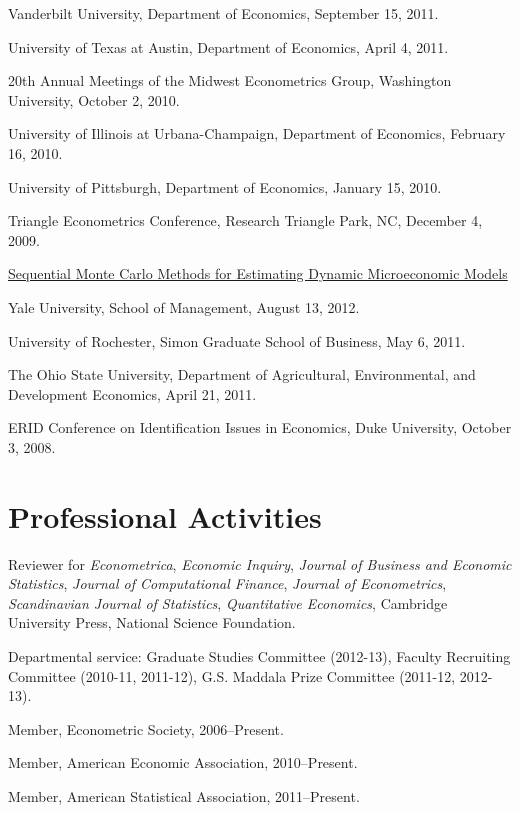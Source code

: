\documentclass[10pt,letterpaper]{article}
\renewenvironment{itemize}{
  \begin{list}{}{
    \setlength{\leftmargin}{1.5em}
    \setlength{\itemsep}{0.25em}
    \setlength{\parskip}{0pt}
    \setlength{\parsep}{0.25em}
  }
}{
  \end{list}
}
\begin{document}
\begin{itemize}
  \begin{itemize}
  \item Vanderbilt University, Department of Economics,
    September 15, 2011.
  \item University of Texas at Austin, Department of Economics,
    April 4, 2011.
  \item 20th Annual Meetings of the Midwest Econometrics Group,
    Washington University,
    October 2, 2010.
  \item University of Illinois at Urbana-Champaign, Department of Economics,
    February 16, 2010.
  \item University of Pittsburgh, Department of Economics,
    January 15, 2010.
  \item Triangle Econometrics Conference,
    Research Triangle Park, NC,
    December 4, 2009.
  \end{itemize}

\item \href{http://jblevins.org/research/smcdmm}{Sequential Monte Carlo Methods for Estimating Dynamic Microeconomic Models}

  \begin{itemize}
  \item Yale University, School of Management,
    August 13, 2012.
  \item University of Rochester, Simon Graduate School of Business,
    May 6, 2011.
  \item The Ohio State University,
    Department of Agricultural, Environmental, and Development Economics,
    April 21, 2011.
  \item ERID Conference on Identification Issues in Economics,
    Duke University, October 3, 2008.
  \end{itemize}

\end{itemize}

\section*{Professional Activities}

\begin{itemize}
\item Reviewer for
  \textit{Econometrica}, %
  \textit{Economic Inquiry}, %
  \textit{Journal of Business and Economic Statistics}, %
  \textit{Journal of Computational Finance}, %
  \textit{Journal of Econometrics}, %
  \textit{Scandinavian Journal of Statistics}, %
  \textit{Quantitative Economics}, %
  Cambridge University Press, %
  National Science Foundation. %
\item Departmental service:
  Graduate Studies Committee (2012-13),
  Faculty Recruiting Committee (2010-11, 2011-12),
  G.S. Maddala Prize Committee (2011-12, 2012-13).
\item Member, Econometric Society, 2006--Present.
\item Member, American Economic Association, 2010--Present.
\item Member, American Statistical Association, 2011--Present.
\end{itemize}
\end{document}
